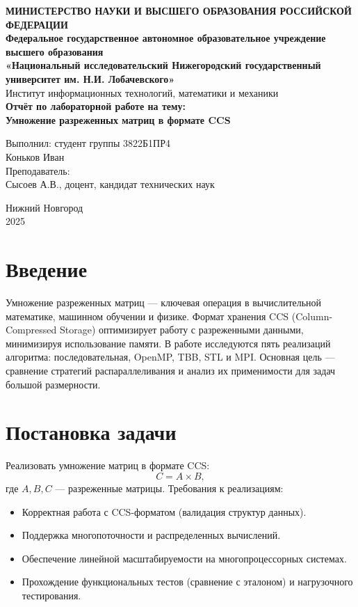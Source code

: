 \documentclass[a4paper,12pt]{article}
\begin{document}
\begin{titlepage}
\begin{center}
\textbf{МИНИСТЕРСТВО НАУКИ И ВЫСШЕГО ОБРАЗОВАНИЯ РОССИЙСКОЙ ФЕДЕРАЦИИ} \\[0.5cm]
\textbf{Федеральное государственное автономное образовательное учреждение высшего образования} \\[0.5cm]
\textbf{«Национальный исследовательский Нижегородский государственный университет им. Н.И. Лобачевского»} \\[0.5cm]
Институт информационных технологий, математики и механики \\
\vfill
{\Large
\textbf{Отчёт по лабораторной работе на тему:} \\[0.5cm]
\textbf{Умножение разреженных матриц в формате CCS} \\
}
\vfill
\begin{flushright}
Выполнил: студент группы 3822Б1ПР4 \\
Коньков Иван \\
\vspace{1cm}
Преподаватель: \\
Сысоев А.В., доцент, кандидат технических наук \\
\end{flushright}
\vfill
Нижний Новгород \\
2025
\end{center}
\end{titlepage}

\tableofcontents
\newpage

\section{Введение}
Умножение разреженных матриц — ключевая операция в вычислительной математике, машинном обучении и физике. Формат хранения CCS (Column-Compressed Storage) оптимизирует работу с разреженными данными, минимизируя использование памяти. В работе исследуются пять реализаций алгоритма: последовательная, OpenMP, TBB, STL и MPI. Основная цель — сравнение стратегий распараллеливания и анализ их применимости для задач большой размерности.

\section{Постановка задачи}
Реализовать умножение матриц в формате CCS:
\[
C = A \times B,
\]
где \( A, B, C \) — разреженные матрицы. Требования к реализациям:
\begin{itemize}
\item Корректная работа с CCS-форматом (валидация структур данных).
\item Поддержка многопоточности и распределенных вычислений.
\item Обеспечение линейной масштабируемости на многопроцессорных системах.
\item Прохождение функциональных тестов (сравнение с эталоном) и нагрузочного тестирования.
\end{itemize}
\end{document}
